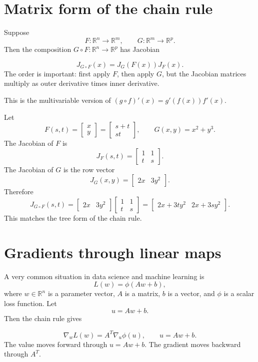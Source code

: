 \documentclass[11pt]{article}
\newcommand{\R}{\mathbb R}
\newcommand{\grad}{\nabla}
\newcommand{\bmat}[1]{\begin{bmatrix}#1\end{bmatrix}}
\begin{document}
\section{Matrix form of the chain rule}

Suppose
\[
F:\R^n\to\R^m,\qquad G:\R^m\to\R^p.
\]
Then the composition $G\circ F:\R^n\to\R^p$ has Jacobian
\begin{formulabox}
\[
\boxed{J_{G\circ F}(x)=J_G(F(x))J_F(x)}.
\]
The order is important: first apply $F$, then apply $G$, but the Jacobian matrices multiply as outer derivative times inner derivative.
\end{formulabox}
This is the multivariable version of $(g\circ f)'(x)=g'(f(x))f'(x)$.

\begin{workedexample}
Let
\[
F(s,t)=\bmat{x\\y}=\bmat{s+t\\ st},
\qquad
G(x,y)=x^2+y^3.
\]
The Jacobian of $F$ is
\[
J_F(s,t)=\begin{bmatrix}1&1\\t&s\end{bmatrix}.
\]
The Jacobian of $G$ is the row vector
\[
J_G(x,y)=\begin{bmatrix}2x&3y^2\end{bmatrix}.
\]
Therefore
\[
J_{G\circ F}(s,t)=\begin{bmatrix}2x&3y^2\end{bmatrix}
\begin{bmatrix}1&1\\t&s\end{bmatrix}
=\begin{bmatrix}2x+3ty^2&2x+3sy^2\end{bmatrix}.
\]
This matches the tree form of the chain rule.
\end{workedexample}

\section{Gradients through linear maps}

A very common situation in data science and machine learning is
\[
L(w)=\phi(Aw+b),
\]
where $w\in\R^n$ is a parameter vector, $A$ is a matrix, $b$ is a vector, and $\phi$ is a scalar loss function. Let
\[
u=Aw+b.
\]
Then the chain rule gives
\begin{formulabox}
\[
\boxed{\grad_w L(w)=A^T\grad_u\phi(u)},\qquad u=Aw+b.
\]
The value moves forward through $u=Aw+b$. The gradient moves backward through $A^T$.
\end{formulabox}
\end{document}
